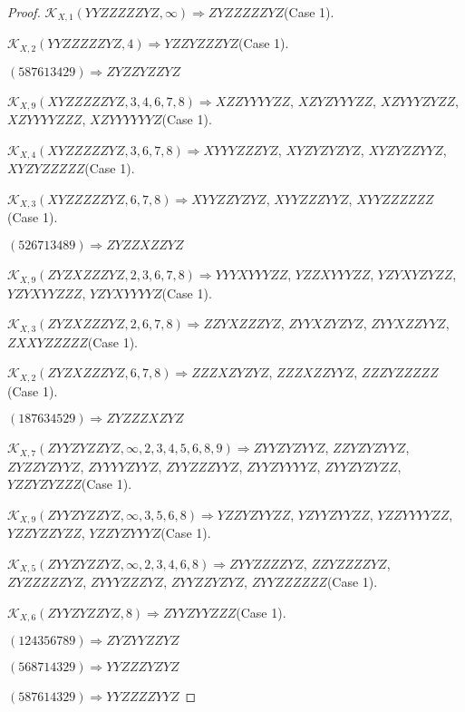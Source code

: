 \documentclass[12pt]{article}
\theoremstyle{plain}
\theoremstyle{definition}
\theoremstyle{remark}
\newcommand{\fancy}[1]{\mathcal{#1}}
\def\K{\fancy{K}}
\begin{document}
\begin{proof}
	$\K_{X,1}(YYZZZZZYZ,\infty)\Rightarrow $$ZYZZZZZYZ$(Case 1).
	
	$\K_{X,2}(YYZZZZZYZ,4)\Rightarrow $$YZZYZZZYZ$(Case 1).
	
	
	
	$(5 8 7 6 1 3 4 2 9)\Rightarrow ZYZZYZZYZ$
	
	
	
	$\K_{X,9}(XYZZZZZYZ,3, 4, 6, 7, 8)\Rightarrow $$XZZYYYYZZ$, $XZYZYYYZZ$, $XZYYYZYZZ$, $XZYYYYZZZ$, $XZYYYYYYZ$(Case 1).
	
	$\K_{X,4}(XYZZZZZYZ,3, 6, 7, 8)\Rightarrow $$XYYYZZZYZ$, $XYZYZYZYZ$, $XYZYZZYYZ$, $XYZYZZZZZ$(Case 1).
	
	$\K_{X,3}(XYZZZZZYZ,6, 7, 8)\Rightarrow $$XYYZZYZYZ$, $XYYZZZYYZ$, $XYYZZZZZZ$(Case 1).
	
	
	
	$(5 2 6 7 1 3 4 8 9)\Rightarrow ZYZZXZZYZ$
	
	
	
	$\K_{X,9}(ZYZXZZZYZ,2, 3, 6, 7, 8)\Rightarrow $$YYYXYYYZZ$, $YZZXYYYZZ$, $YZYXYZYZZ$, $YZYXYYZZZ$, $YZYXYYYYZ$(Case 1).
	
	$\K_{X,3}(ZYZXZZZYZ,2, 6, 7, 8)\Rightarrow $$ZZYXZZZYZ$, $ZYYXZYZYZ$, $ZYYXZZYYZ$, $ZXXYZZZZZ$(Case 1).
	
	$\K_{X,2}(ZYZXZZZYZ,6, 7, 8)\Rightarrow $$ZZZXZYZYZ$, $ZZZXZZYYZ$, $ZZZYZZZZZ$(Case 1).
	
	
	
	$(1 8 7 6 3 4 5 2 9)\Rightarrow ZYZZZXZYZ$
	
	
	
	$\K_{X,7}(ZYYZYZZYZ,\infty,2, 3, 4, 5, 6, 8, 9)\Rightarrow $$ZYYZYZYYZ$, $ZZYZYZYYZ$, $ZYZZYZYYZ$, $ZYYYYZYYZ$, $ZYYZZZYYZ$, $ZYYZYYYYZ$, $ZYYZYZYZZ$, $YZZYZYZZZ$(Case 1).
	
	$\K_{X,9}(ZYYZYZZYZ,\infty,3, 5, 6, 8)\Rightarrow $$YZZYZYYZZ$, $YZYYZYYZZ$, $YZZYYYYZZ$, $YZZYZZYZZ$, $YZZYZYYYZ$(Case 1).
	
	$\K_{X,5}(ZYYZYZZYZ,\infty,2, 3, 4, 6, 8)\Rightarrow $$ZYYZZZZYZ$, $ZZYZZZZYZ$, $ZYZZZZZYZ$, $ZYYYZZZYZ$, $ZYYZZYZYZ$, $ZYYZZZZZZ$(Case 1).
	
	$\K_{X,6}(ZYYZYZZYZ,8)\Rightarrow $$ZYYZYYZZZ$(Case 1).
	
	
	
	$(1 2 4 3 5 6 7 8 9)\Rightarrow ZYZYYZZYZ$
	
	$(5 6 8 7 1 4 3 2 9)\Rightarrow YYZZZYZYZ$
	
	$(5 8 7 6 1 4 3 2 9)\Rightarrow YYZZZZYYZ$
	
	
	

\end{proof}
\end{document}
